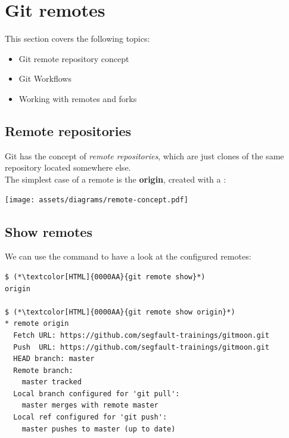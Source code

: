 \section{Git remotes}
\begin{frame}[fragile]
  \slidetitle
  This section covers the following topics:
  \begin{itemize}
    \item Git remote repository concept
    \item Git Workflows
    \item Working with remotes and forks
  \end{itemize}
\end{frame}

\subsection{Remote repositories}
\begin{frame}[fragile]
  \subslidetitle
  Git has the concept of \textit{remote repositories},
  which are just clones of the same repository located
  somewhere else. \\

  The simplest case of a remote is the \textbf{origin},
  created with a :

  \vspace{3em}
  \centerline{\texttt{[image: assets/diagrams/remote-concept.pdf]}}
\end{frame}

\subsection{Show remotes}
\begin{frame}[fragile]
  \subslidetitle
  We can use the  command to have a look at the configured remotes:
  \begin{lstlisting}
$ (*\textcolor[HTML]{0000AA}{git remote show}*)
origin

$ (*\textcolor[HTML]{0000AA}{git remote show origin}*)
* remote origin
  Fetch URL: https://github.com/segfault-trainings/gitmoon.git
  Push  URL: https://github.com/segfault-trainings/gitmoon.git
  HEAD branch: master
  Remote branch:
    master tracked
  Local branch configured for 'git pull':
    master merges with remote master
  Local ref configured for 'git push':
    master pushes to master (up to date)
\end{lstlisting}
\end{frame}

